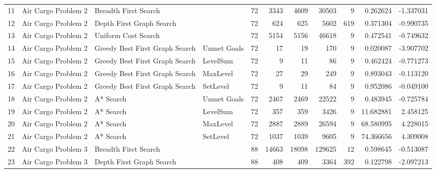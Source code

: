 \begin{tabular}{llllrrrrrrr}
11 &  Air Cargo Problem 2 &            Breadth First Search &              &       72 &        3343 &        4609 &      30503 &            9 &     0.262624 &   -1.337031 \\
12 &  Air Cargo Problem 2 &        Depth First Graph Search &              &       72 &         624 &         625 &       5602 &          619 &     0.371304 &   -0.990735 \\
13 &  Air Cargo Problem 2 &             Uniform Cost Search &              &       72 &        5154 &        5156 &      46618 &            9 &     0.472541 &   -0.749632 \\
14 &  Air Cargo Problem 2 &  Greedy Best First Graph Search &  Unmet Goals &       72 &          17 &          19 &        170 &            9 &     0.020087 &   -3.907702 \\
15 &  Air Cargo Problem 2 &  Greedy Best First Graph Search &     LevelSum &       72 &           9 &          11 &         86 &            9 &     0.462424 &   -0.771273 \\
16 &  Air Cargo Problem 2 &  Greedy Best First Graph Search &     MaxLevel &       72 &          27 &          29 &        249 &            9 &     0.893043 &   -0.113120 \\
17 &  Air Cargo Problem 2 &  Greedy Best First Graph Search &     SetLevel &       72 &           9 &          11 &         84 &            9 &     0.952086 &   -0.049100 \\
18 &  Air Cargo Problem 2 &                       A* Search &  Unmet Goals &       72 &        2467 &        2469 &      22522 &            9 &     0.483945 &   -0.725784 \\
19 &  Air Cargo Problem 2 &                       A* Search &     LevelSum &       72 &         357 &         359 &       3426 &            9 &    11.682881 &    2.458125 \\
20 &  Air Cargo Problem 2 &                       A* Search &     MaxLevel &       72 &        2887 &        2889 &      26594 &            9 &    68.580995 &    4.228015 \\
21 &  Air Cargo Problem 2 &                       A* Search &     SetLevel &       72 &        1037 &        1039 &       9605 &            9 &    74.366656 &    4.309008 \\
22 &  Air Cargo Problem 3 &            Breadth First Search &              &       88 &       14663 &       18098 &     129625 &           12 &     0.598645 &   -0.513087 \\
23 &  Air Cargo Problem 3 &        Depth First Graph Search &              &       88 &         408 &         409 &       3364 &          392 &     0.122798 &   -2.097213 \\

\end{tabular}
